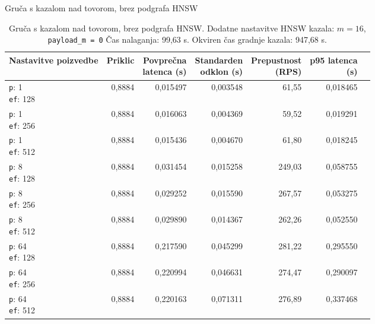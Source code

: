 \begin{table}[htbp]
  \centering
\small
  \caption{Gruča s kazalom nad tovorom, brez podgrafa HNSW}
  \label{tab:cluster-2cpu-4ram:payload-nosubgraph:qdrant-dipl-baseline-payload-no-subgraph-m-16-ef-128-random-768-100-tenants-extended-upload-2026-08-17-21-15-22.json}
  \begin{tabularx}{\textwidth}{Xrrrrrr}
    \toprule
    Nastavitve poizvedbe & Priklic & \makecell{Povprečna\\latenca (s)} & \makecell{Standarden\\odklon (s)} & \makecell{Prepustnost\\(RPS)} & \makecell{p95 latenca\\(s)}  \\
    \midrule
    \makecell{\texttt{p}: 1\\\texttt{ef}: 128} & 0,8884 & 0,015497 & 0,003548 & 61,55 & 0,018465 \\
    \makecell{\texttt{p}: 1\\\texttt{ef}: 256} & 0,8884 & 0,016063 & 0,004369 & 59,52 & 0,019291 \\
    \makecell{\texttt{p}: 1\\\texttt{ef}: 512} & 0,8884 & 0,015436 & 0,004670 & 61,80 & 0,018245 \\
    \makecell{\texttt{p}: 8\\\texttt{ef}: 128} & 0,8884 & 0,031454 & 0,015258 & 249,03 & 0,058755 \\
    \makecell{\texttt{p}: 8\\\texttt{ef}: 256} & 0,8884 & 0,029252 & 0,015590 & 267,57 & 0,053275 \\
    \makecell{\texttt{p}: 8\\\texttt{ef}: 512} & 0,8884 & 0,029890 & 0,014367 & 262,26 & 0,052550 \\
    \makecell{\texttt{p}: 64\\\texttt{ef}: 128} & 0,8884 & 0,217590 & 0,045299 & 281,22 & 0,295550 \\
    \makecell{\texttt{p}: 64\\\texttt{ef}: 256} & 0,8884 & 0,220994 & 0,046631 & 274,47 & 0,290097 \\
    \makecell{\texttt{p}: 64\\\texttt{ef}: 512} & 0,8884 & 0,220163 & 0,071311 & 276,89 & 0,337468 \\
    \bottomrule
  \end{tabularx}
\caption* {Gruča s kazalom nad tovorom, brez podgrafa HNSW. Dodatne nastavitve HNSW kazala: $m = 16$, \texttt{payload\_m = 0} Čas nalaganja: 99,63 s. Okviren čas gradnje kazala: 947,68 s.}\end{table}


